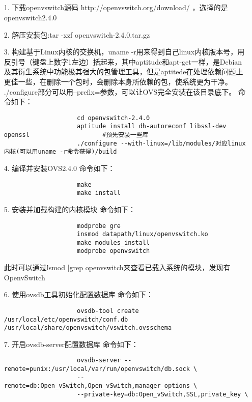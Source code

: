 \documentclass[a4paper,left=1.5cm,right=1.5cm,11pt]{article}
\begin{document}
\tableofcontents

\clearpage

\subsection{}
	\begin{itemize}
        \item[1.]下载openvswitch源码 http://openvswitch.org/download/ ，选择的是openvswitch2.4.0
		\item[2.]解压安装包:tar -xzf openvswitch-2.4.0.tar.gz
		\item[3.]构建基于Linux内核的交换机，uname -r用来得到自己linux内核版本号，用反引号（键盘上数字1左边）括起来，其中aptitude和apt-get一样，是Debian及其衍生系统中功能极其强大的包管理工具，但是aptitede在处理依赖问题上更佳一些，在删除一个包时，会删除本身所依赖的包，使系统更为干净。
                 ./configure部分可以用--prefix=参数，可以让OVS完全安装在该目录底下。
				 命令如下：
				 \begin{lstlisting}
					cd openvswitch-2.4.0
					aptitude install dh-autoreconf libssl-dev openssl                    #预先安装一些库
					./configure --with-linux=/lib/modules/对应linux内核(可以用uname -r命令获得)/build
				 \end{lstlisting}
		\item[4.]编译并安装OVS2.4.0
		         命令如下：
				 \begin{lstlisting}
					make
					make install
				 \end{lstlisting}
		\item[5.]安装并加载构建的内核模块
				 命令如下：
				 \begin{lstlisting}
					modprobe gre
					insmod datapath/linux/openvswitch.ko
					make modules_install
					modprobe openvswitch
				 \end{lstlisting}
				 此时可以通过lsmod |grep openvswitch来查看已载入系统的模块，发现有OpenvSwitch
		\item[6.]使用ovsdb工具初始化配置数据库
				命令如下：
				 \begin{lstlisting}
					ovsdb-tool create /usr/local/etc/openvswitch/conf.db /usr/local/share/openvswitch/vswitch.ovsschema
				 \end{lstlisting}
		\item[7.]开启ovsdb-server配置数据库
				命令如下：
				 \begin{lstlisting}
					ovsdb-server --remote=punix:/usr/local/var/run/openvswitch/db.sock \
					--remote=db:Open_vSwitch,Open_vSwitch,manager_options \
					--private-key=db:Open_vSwitch,SSL,private_key \

\end{lstlisting}
\end{itemize}
\end{document}
